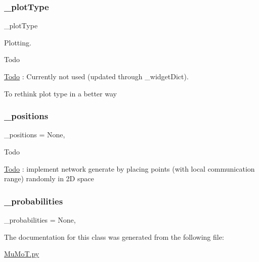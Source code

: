 \subsubsection{\texorpdfstring{\+\_\+plot\+Type}{\_plotType}}
{\footnotesize\ttfamily \+\_\+plot\+Type\hspace{0.3cm}{\ttfamily [private]}}



Plotting. 

\begin{DoxyRefDesc}{Todo}
\item[\hyperlink{todo__todo000049}{Todo}]\+: Currently not used (updated through \+\_\+widget\+Dict).\end{DoxyRefDesc}
To rethink plot type in a better way \mbox{\label{class_mu_mo_t_1_1_mu_mo_tmultiagent_view_a8be9986760a86837e04718906d18d596}} 
\subsubsection{\texorpdfstring{\+\_\+positions}{\_positions}}
{\footnotesize\ttfamily \+\_\+positions = None\hspace{0.3cm}{\ttfamily [static]}, {\ttfamily [private]}}

\begin{DoxyRefDesc}{Todo}
\item[\hyperlink{todo__todo000051}{Todo}]\+: implement network generate by placing points (with local communication range) randomly in 2D space \end{DoxyRefDesc}
\mbox{\label{class_mu_mo_t_1_1_mu_mo_tmultiagent_view_aaf2c34c5022e4e3c872dbee11e50ea9b}} 
\subsubsection{\texorpdfstring{\+\_\+probabilities}{\_probabilities}}
{\footnotesize\ttfamily \+\_\+probabilities = None\hspace{0.3cm}{\ttfamily [static]}, {\ttfamily [private]}}



The documentation for this class was generated from the following file\+:\begin{DoxyCompactItemize}
\item 
\hyperlink{_mu_mo_t_8py}{Mu\+Mo\+T.\+py}\end{DoxyCompactItemize}
